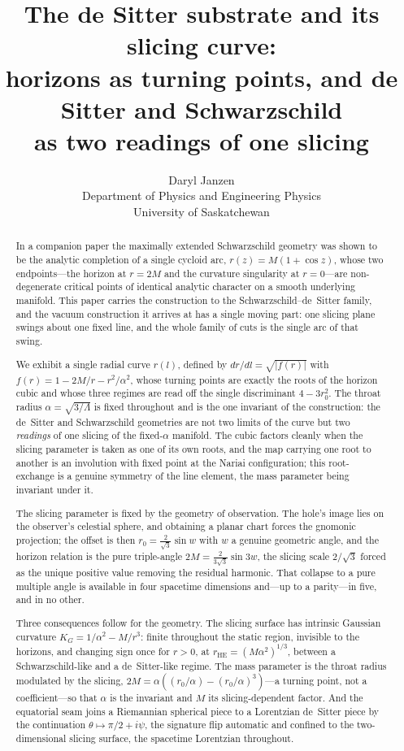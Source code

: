 \documentclass[11pt,a4paper]{article}
\title{The de Sitter substrate and its slicing curve:\\
\large horizons as turning points, and de Sitter and Schwarzschild\\
as two readings of one slicing}
\author{Daryl Janzen\\
\small Department of Physics and Engineering Physics\\
\small University of Saskatchewan}
\date{}
\theoremstyle{definition}
\begin{document}
\maketitle

\begin{abstract}
In a companion paper the maximally extended Schwarzschild geometry was shown to be the analytic completion of a single cycloid arc, $r(z)=M(1+\cos z)$, whose two endpoints---the horizon at $r=2M$ and the curvature singularity at $r=0$---are non-degenerate critical points of identical analytic character on a smooth underlying manifold. This paper carries the construction to the Schwarzschild--de~Sitter family, and the vacuum construction it arrives at has a single moving part: one slicing plane swings about one fixed line, and the whole family of cuts is the single arc of that swing.

We exhibit a single radial curve $r(l)$, defined by $dr/dl=\sqrt{|f(r)|}$ with $f(r)=1-2M/r-r^{2}/\alpha^{2}$, whose turning points are exactly the roots of the horizon cubic and whose three regimes are read off the single discriminant $4-3r_{0}^{2}$. The throat radius $\alpha=\sqrt{3/\Lambda}$ is fixed throughout and is the one invariant of the construction: the de~Sitter and Schwarzschild geometries are not two limits of the curve but two \emph{readings} of one slicing of the fixed-$\alpha$ manifold. The cubic factors cleanly when the slicing parameter is taken as one of its own roots, and the map carrying one root to another is an involution with fixed point at the Nariai configuration; this root-exchange is a genuine symmetry of the line element, the mass parameter being invariant under it.

The slicing parameter is fixed by the geometry of observation. The hole's image lies on the observer's celestial sphere, and obtaining a planar chart forces the gnomonic projection; the offset is then $r_{0}=\tfrac{2}{\sqrt3}\sin w$ with $w$ a genuine geometric angle, and the horizon relation is the pure triple-angle $2M=\tfrac{2}{3\sqrt3}\sin 3w$, the slicing scale $2/\sqrt3$ forced as the unique positive value removing the residual harmonic. That collapse to a pure multiple angle is available in four spacetime dimensions and---up to a parity---in five, and in no other.

Three consequences follow for the geometry. The slicing surface has intrinsic Gaussian curvature $K_{G}=1/\alpha^{2}-M/r^{3}$: finite throughout the static region, invisible to the horizons, and changing sign once for $r>0$, at $r_{\mathrm{HE}}=(M\alpha^{2})^{1/3}$, between a Schwarzschild-like and a de~Sitter-like regime. The mass parameter is the throat radius modulated by the slicing, $2M=\alpha((r_{0}/\alpha)-(r_{0}/\alpha)^{3})$---a turning point, not a coefficient---so that $\alpha$ is the invariant and $M$ its slicing-dependent factor. And the equatorial seam joins a Riemannian spherical piece to a Lorentzian de~Sitter piece by the continuation $\theta\mapsto\pi/2+i\psi$, the signature flip automatic and confined to the two-dimensional slicing surface, the spacetime Lorentzian throughout.


\end{abstract}
\end{document}
